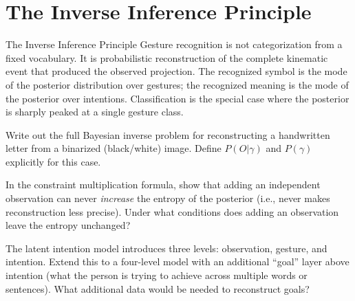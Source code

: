 \section{The Inverse Inference Principle}

\begin{namedthm}{The Inverse Inference Principle}
  Gesture recognition is not categorization from a fixed vocabulary.
  It is probabilistic reconstruction of the complete kinematic event
  that produced the observed projection. The recognized symbol is
  the mode of the posterior distribution over gestures; the recognized
  meaning is the mode of the posterior over intentions. Classification
  is the special case where the posterior is sharply peaked at a single
  gesture class.
\end{namedthm}

\begin{exercise}
  Write out the full Bayesian inverse problem for reconstructing a
  handwritten letter from a binarized (black/white) image. Define
  $P(O | \gamma)$ and $P(\gamma)$ explicitly for this case.
\end{exercise}

\begin{exercise}
  In the constraint multiplication formula, show that adding an
  independent observation can never \emph{increase} the entropy
  of the posterior (i.e., never makes reconstruction less precise).
  Under what conditions does adding an observation leave the entropy
  unchanged?
\end{exercise}

\begin{exercise}[title={Harder}]
  The latent intention model introduces three levels: observation,
  gesture, and intention. Extend this to a four-level model with
  an additional ``goal'' layer above intention (what the person
  is trying to achieve across multiple words or sentences).
  What additional data would be needed to reconstruct goals?
\end{exercise}
